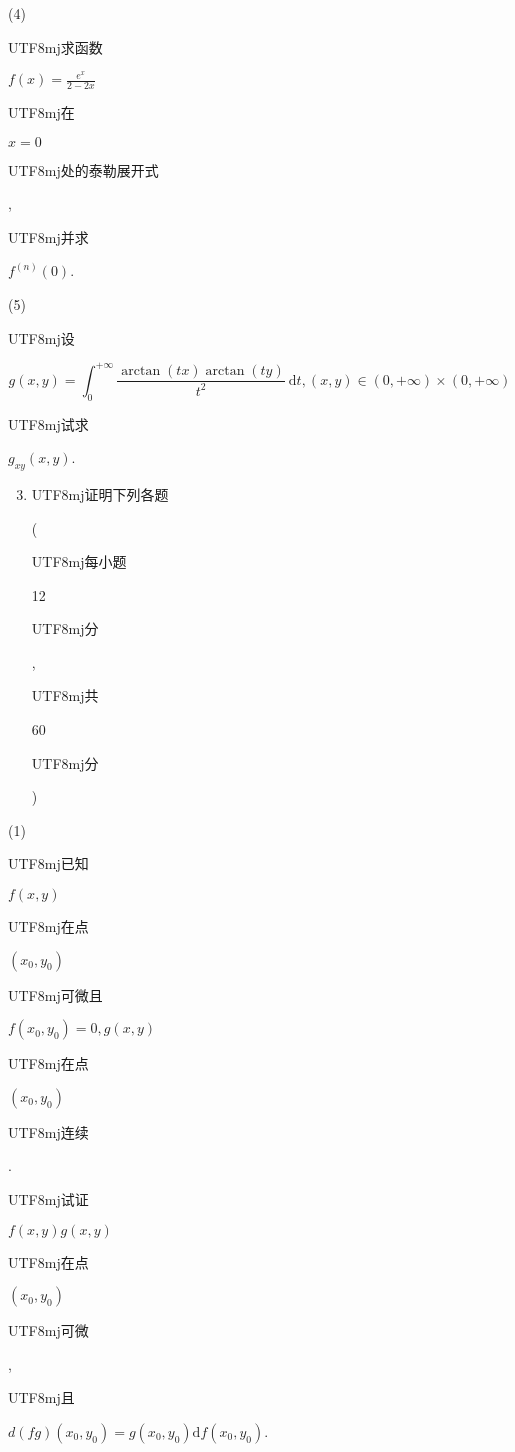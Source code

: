 \documentclass[10pt]{article}
\begin{document}
(4) \begin{CJK}{UTF8}{mj}求函数\end{CJK} $f(x)=\frac{e^{x}}{2-2 x}$ \begin{CJK}{UTF8}{mj}在\end{CJK} $x=0$ \begin{CJK}{UTF8}{mj}处的泰勒展开式\end{CJK}, \begin{CJK}{UTF8}{mj}并求\end{CJK} $f^{(n)}(0)$.

(5) \begin{CJK}{UTF8}{mj}设\end{CJK}
$$
g(x, y)=\int_{0}^{+\infty} \frac{\arctan (t x) \arctan (t y)}{t^{2}} \mathrm{~d} t,(x, y) \in(0,+\infty) \times(0,+\infty)
$$
\begin{CJK}{UTF8}{mj}试求\end{CJK} $g_{x y}(x, y)$.

\begin{enumerate}
  \setcounter{enumi}{2}
  \item \begin{CJK}{UTF8}{mj}证明下列各题\end{CJK} (\begin{CJK}{UTF8}{mj}每小题\end{CJK} 12 \begin{CJK}{UTF8}{mj}分\end{CJK}, \begin{CJK}{UTF8}{mj}共\end{CJK} 60 \begin{CJK}{UTF8}{mj}分\end{CJK})
\end{enumerate}
(1) \begin{CJK}{UTF8}{mj}已知\end{CJK} $f(x, y)$ \begin{CJK}{UTF8}{mj}在点\end{CJK} $\left(x_{0}, y_{0}\right)$ \begin{CJK}{UTF8}{mj}可微且\end{CJK} $f\left(x_{0}, y_{0}\right)=0, g(x, y)$ \begin{CJK}{UTF8}{mj}在点\end{CJK} $\left(x_{0}, y_{0}\right)$ \begin{CJK}{UTF8}{mj}连续\end{CJK}. \begin{CJK}{UTF8}{mj}试证\end{CJK} $f(x, y) g(x, y)$ \begin{CJK}{UTF8}{mj}在点\end{CJK} $\left(x_{0}, y_{0}\right)$ \begin{CJK}{UTF8}{mj}可微\end{CJK}, \begin{CJK}{UTF8}{mj}且\end{CJK} $d(f g)\left(x_{0}, y_{0}\right)=g\left(x_{0}, y_{0}\right) \mathrm{d} f\left(x_{0}, y_{0}\right)$.
\end{document}
